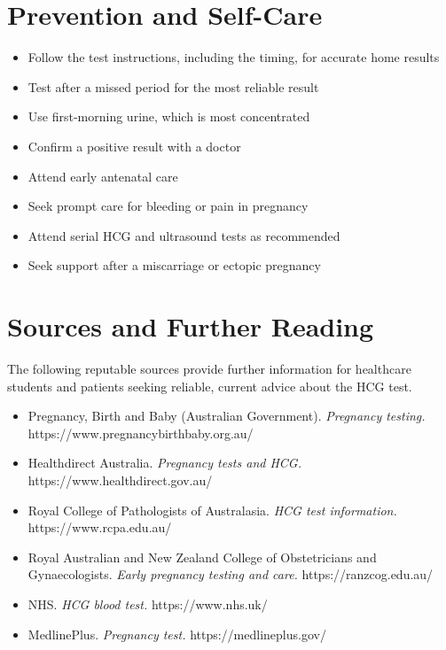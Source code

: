 \section*{Prevention and Self-Care}
\begin{itemize}
    \item Follow the test instructions, including the timing, for accurate home results
    \item Test after a missed period for the most reliable result
    \item Use first-morning urine, which is most concentrated
    \item Confirm a positive result with a doctor
    \item Attend early antenatal care
    \item Seek prompt care for bleeding or pain in pregnancy
    \item Attend serial HCG and ultrasound tests as recommended
    \item Seek support after a miscarriage or ectopic pregnancy
\end{itemize}

\section*{Sources and Further Reading}
The following reputable sources provide further information for healthcare students and patients seeking reliable, current advice about the HCG test.

\begin{itemize}
    \item Pregnancy, Birth and Baby (Australian Government). \textit{Pregnancy testing.} https://www.pregnancybirthbaby.org.au/
    \item Healthdirect Australia. \textit{Pregnancy tests and HCG.} https://www.healthdirect.gov.au/
    \item Royal College of Pathologists of Australasia. \textit{HCG test information.} https://www.rcpa.edu.au/
    \item Royal Australian and New Zealand College of Obstetricians and Gynaecologists. \textit{Early pregnancy testing and care.} https://ranzcog.edu.au/
    \item NHS. \textit{HCG blood test.} https://www.nhs.uk/
    \item MedlinePlus. \textit{Pregnancy test.} https://medlineplus.gov/
\end{itemize}
